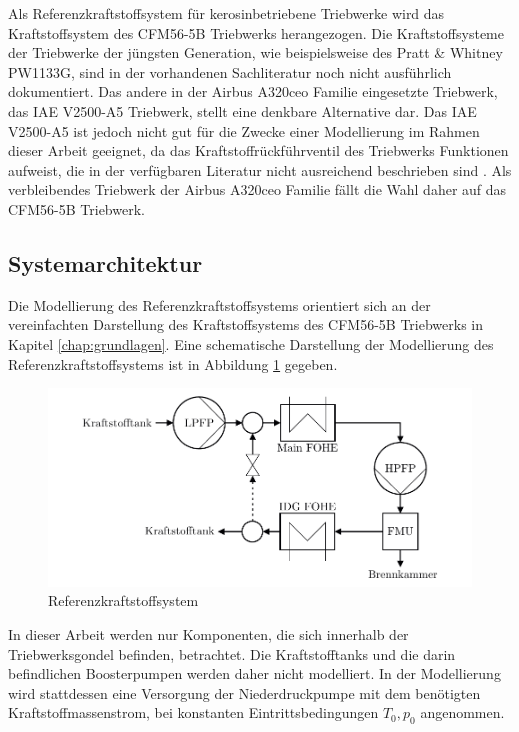 Als Referenzkraftstoffsystem für kerosinbetriebene Triebwerke wird das Kraftstoffsystem des CFM56-5B Triebwerks herangezogen. Die Kraftstoffsysteme der Triebwerke der jüngsten Generation, wie beispielsweise des Pratt \& Whitney PW1133G, sind in der vorhandenen Sachliteratur noch nicht ausführlich dokumentiert. Das andere in der Airbus A320ceo Familie eingesetzte Triebwerk, das IAE V2500-A5 Triebwerk, stellt eine denkbare Alternative dar. Das IAE V2500-A5 ist jedoch nicht gut für die Zwecke einer Modellierung im Rahmen dieser Arbeit geeignet, da das Kraftstoffrückführventil des  Triebwerks Funktionen aufweist, die in der verfügbaren Literatur nicht ausreichend beschrieben sind \cite{LinkeDiesinger.2014}. Als verbleibendes Triebwerk der Airbus A320ceo Familie fällt die Wahl daher auf das CFM56-5B Triebwerk. 

\subsection{Systemarchitektur}

Die Modellierung des Referenzkraftstoffsystems orientiert sich an der vereinfachten Darstellung des Kraftstoffsystems des CFM56-5B Triebwerks in Kapitel \ref{chap:grundlagen}. Eine schematische Darstellung der Modellierung des Referenzkraftstoffsystems ist in Abbildung \ref{fig:Referenz} gegeben.

\begin{figure}[ht]
\centering
\includegraphics[width=1\linewidth]{4_Abbildungen/2_Hauptteil/Kraftstoffsystem Abbildungen/Referenz.pdf}
  \caption{Referenzkraftstoffsystem}
  \label{fig:Referenz}
\end{figure}
\FloatBarrier 

In dieser Arbeit werden nur Komponenten, die sich innerhalb der Triebwerksgondel befinden, betrachtet. Die Kraftstofftanks und die darin befindlichen Boosterpumpen werden daher nicht modelliert. In der Modellierung wird stattdessen eine Versorgung der Niederdruckpumpe mit dem benötigten Kraftstoffmassenstrom, bei  konstanten Eintrittsbedingungen $T_0, p_0$ angenommen. 

